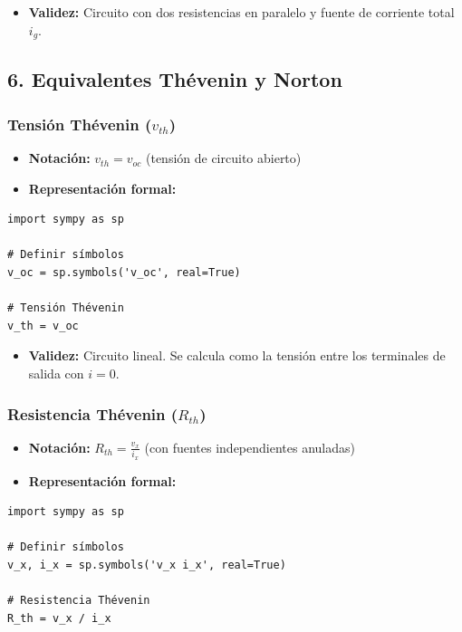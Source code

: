 \documentclass[11pt,a4paper]{article}
\begin{document}
\begin{itemize}[leftmargin=*,topsep=2pt,itemsep=1pt]
  \item \textbf{Validez:} Circuito con dos resistencias en paralelo y fuente de corriente total $i_g$.
\end{itemize}


\subsection*{6. Equivalentes Thévenin y Norton}


\subsubsection*{Tensión Thévenin ($v_{th}$)}


\begin{itemize}[leftmargin=*,topsep=2pt,itemsep=1pt]
  \item \textbf{Notación:} $v_{th} = v_{oc}$ (tensión de circuito abierto)
  \item \textbf{Representación formal:}
\end{itemize}


\begin{lstlisting}
import sympy as sp

# Definir símbolos
v_oc = sp.symbols('v_oc', real=True)

# Tensión Thévenin
v_th = v_oc
\end{lstlisting}


\begin{itemize}[leftmargin=*,topsep=2pt,itemsep=1pt]
  \item \textbf{Validez:} Circuito lineal. Se calcula como la tensión entre los terminales de salida con $i=0$.
\end{itemize}


\subsubsection*{Resistencia Thévenin ($R_{th}$)}


\begin{itemize}[leftmargin=*,topsep=2pt,itemsep=1pt]
  \item \textbf{Notación:} $R_{th} = \frac{v_x}{i_x}$ (con fuentes independientes anuladas)
  \item \textbf{Representación formal:}
\end{itemize}


\begin{lstlisting}
import sympy as sp

# Definir símbolos
v_x, i_x = sp.symbols('v_x i_x', real=True)

# Resistencia Thévenin
R_th = v_x / i_x
\end{lstlisting}
\end{document}
